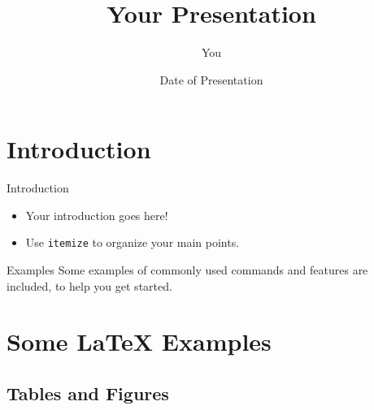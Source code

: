 \documentclass{beamer}
\title[Your Short Title]{Your Presentation}
\author{You}
\institute{Where You're From}
\date{Date of Presentation}
\begin{document}
    \begin{frame}
      \titlepage
    \end{frame}


    \section{Introduction}

    \begin{frame}{Introduction}

    \begin{itemize}
      \item Your introduction goes here!
      \item Use \texttt{itemize} to organize your main points.
    \end{itemize}

    \vskip 1cm

    \begin{block}{Examples}
    Some examples of commonly used commands and features are included, to help you get started.
    \end{block}

    \end{frame}

    \section{Some \LaTeX{} Examples}

    \subsection{Tables and Figures}
\end{document}
